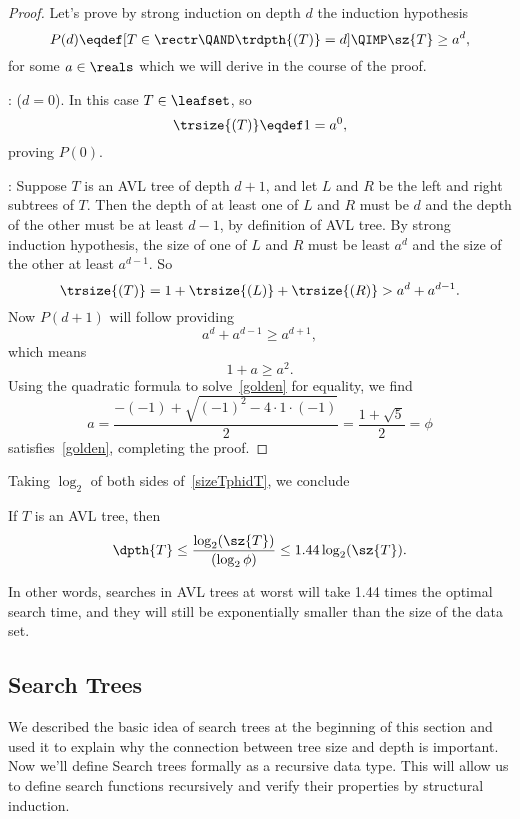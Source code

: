 \begin{definition}
\begin{lemma}
\begin{proof}
Let's prove by strong induction on depth $d$ the induction hypothesis
\[
P(d) \eqdef [T \in \rectr \QAND \trdpth{(T)} = d] \QIMP \sz{T}
\geq a^d,
\]
for some $a \in \reals$ which we will derive in the course of the
proof.

: ($d=0$).
In this case $T \in \leafset$, so
\[
\trsize{(T)} \eqdef 1 = a^0,
\]
proving $P(0)$.

: Suppose $T$ is an AVL tree of depth
$d+1$, and let $L$ and $R$ be the left and right subtrees of $T$.
Then the depth of at least one of $L$ and $R$ must be $d$ and the
depth of the other must be at least $d-1$, by definition of AVL tree.
By strong induction hypothesis, the size of one of $L$ and $R$ must be
least $a^d$ and the size of the other at least $a^{d-1}$.  So
\[
\trsize{(T)}
  = 1 + \trsize{(L)} + \trsize{(R)}
  > a^d + a^{d-1}.
\]            
Now $P(d+1)$ will follow providing
\[
 a^d + a^{d-1} \geq a^{d+1},
\]
which means
\begin{equation}\label{golden}
1+a \geq a^2.
\end{equation}
Using the quadratic formula to solve~\eqref{golden} for equality, we find
\[
a = \frac{-(-1) + \sqrt{(-1)^2-4\cdot 1\cdot (-1)}}{2} = \frac{1 + \sqrt{5}}{2} = \phi
\]
satisfies~\eqref{golden}, completing the proof.
\end{proof}
\end{lemma}

Taking $\log_2$ of both sides of~\eqref{sizeTphidT}, we conclude
\begin{corollary}
If $T$ is an AVL tree, then
\[
\dpth{T} \leq \frac{\log_2(\sz{T})}{(\log_2 \phi)} \leq 1.44
\log_2(\sz{T}).
\]
\end{corollary}
In other words, searches in AVL trees at worst will take 1.44 times
the optimal search time, and they will still be exponentially smaller
than the size of the data set.

\subsection{Search Trees}
We described the basic idea of search trees at the beginning of this
section and used it to explain why the connection between tree size
and depth is important.  Now we'll define Search trees formally as a
recursive data type.  This will allow us to define search functions
recursively and verify their properties by structural induction.


\end{definition}

